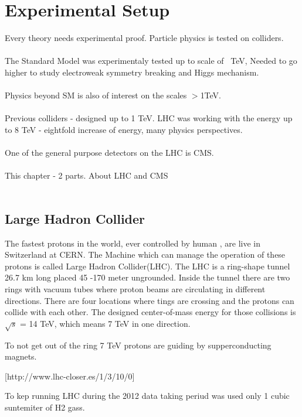 \chapter{Experimental Setup}
Every theory needs experimental proof. Particle physics is tested on colliders.
\\
\\
The Standard Model was experimentaly tested up to scale of ~TeV, Needed to go higher to 
study electroweak symmetry breaking and Higgs mechanism.
\\
\\
Physics beyond SM is also of interest on the scales $>$1TeV.
\\
\\
Previous colliders - designed up to 1 TeV. LHC \cite{LHCmachine} was working with the energy
up to 8 TeV - eightfold increase of energy, many physics perspectives.
\\
\\
One of the general purpose detectors on the LHC is CMS.
\\
\\
This chapter - 2 parts. About LHC and CMS
\\
\\

\section{Large Hadron Collider}

The fastest protons in the world, ever controlled by human , are live in Switzerland at CERN.
The Machine which can manage the operation of these protons is called Large Hadron Collider(LHC). 
The LHC is a ring-shape tunnel 26.7 km long  placed 45 -170 meter ungrounded. 
Inside the tunnel there are two rings with vacuum tubes where proton beams are circulating in different directions.
There are four locations where tings are crossing and the protons can collide with each other. 
The designed center-of-mass energy for those collisions is $\sqrt{s}$ = 14 TeV, which means 7 TeV in one direction.


To not get out of the ring 7 TeV protons are guiding by supperconducting magnets. 



[http://www.lhc-closer.es/1/3/10/0]

To kep running LHC during the 2012 data taking periud was used only 1 cubic suntemiter of H2 gass.

